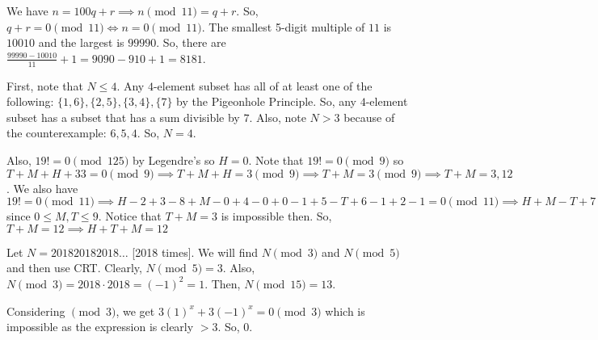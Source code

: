 \documentclass[11pt]{article}
\begin{document}
\begin{sol}
We have $n=100q+r\implies n\pmod{11}=q+r$. So, $q+r=0\pmod{11}\iff n=0\pmod{11}$. The smallest 5-digit multiple of $11$ is $10010$ and the largest is $99990$. So, there are $\frac{99990-10010}{11}+1=9090-910+1=\boxed{8181}$.
\end{sol}


\begin{sol}
First, note that $N\leq 4$. Any $4$-element subset has all of at least one of the following: $\{1,6\},\{2,5\},\{3,4\},\{7\}$ by the Pigeonhole Principle. So, any $4$-element subset has a subset that has a sum divisible by $7$. Also, note $N>3$ because of the counterexample: $6,5,4$. So, $N=\boxed{4}$. 
\end{sol}


\begin{sol}
Also, $19!=0\pmod{125}$ by Legendre's so $H=0$. Note that $19!=0\pmod{9}$ so $T+M+H+33=0\pmod{9}\implies T+M+H=3\pmod{9}\implies T+M=3\pmod{9}\implies T+M=3,12$.  We also have $19!=0\pmod{11}\implies H-2+3-8+M-0+4-0+0-1+5-T+6-1+2-1=0\pmod{11}\implies H+M-T+7=0\pmod{11}\implies H+M-T=4\pmod{11}\implies M-T=4\pmod{11}\implies M-T=4$ since $0\leq M,T\leq 9$. Notice that $T+M=3$ is impossible then. So, $T+M=12\implies H+T+M=\boxed{12}$
\end{sol}


\begin{sol}
Let $N=201820182018\ldots$ [2018 times]. We will find $N\pmod{3}$ and $N\pmod{5}$ and then use CRT. Clearly, $N\pmod{5}=3$. Also, $N\pmod{3}=2018\cdot 2018=(-1)^2=1$. Then, $N\pmod{15}=\boxed{13}$.
\end{sol}


\begin{sol}
Considering $\pmod{3}$, we get $3(1)^x+3(-1)^x=0\pmod{3}$ which is impossible as the expression is clearly $>3$. So, $\boxed{0}$.
\end{sol}
\end{document}
